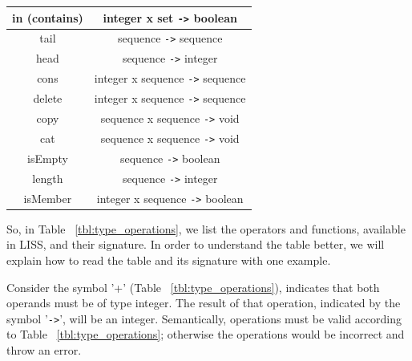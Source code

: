 \documentclass[
  oneside,
  11pt, a4paper,
  footinclude=true,
  headinclude=true,
  cleardoublepage=empty
]{scrbook}
\begin{document}
\begin{table}[]
\begin{tabular}{|c|c|}
in (contains)                              & integer x set \verb+->+ boolean                                            \\ \hline
tail                                      & sequence \verb+->+ sequence                                                \\ \hline
head                                      & sequence \verb+->+ integer                                                 \\ \hline
cons                                      & integer x sequence \verb+->+ sequence                                      \\ \hline
delete                                    & integer x sequence \verb+->+ sequence                                      \\ \hline
copy                                      & sequence x sequence \verb+->+ void                                         \\ \hline
cat                                       & sequence x sequence \verb+->+ void                                         \\ \hline
isEmpty                                   & sequence \verb+->+ boolean                                                 \\ \hline
length                                    & sequence \verb+->+ integer                                                 \\ \hline
isMember                                  & integer x sequence \verb+->+ boolean                                       \\ \hline
\end{tabular}
\end{table}

\newpage

So, in Table ~\ref{tbl:type_operations}, we list the operators and functions, available in LISS, and their signature.
In order to understand the table better, we will explain how to read the table and its signature with one example.

Consider the symbol '+' (Table ~\ref{tbl:type_operations}), indicates that both operands must be of type integer.
The result of that operation, indicated by the symbol '\verb+->+', will be an integer.
Semantically, operations must be valid according to Table ~\ref{tbl:type_operations}; otherwise the operations would be incorrect and throw an error.
\end{document}
